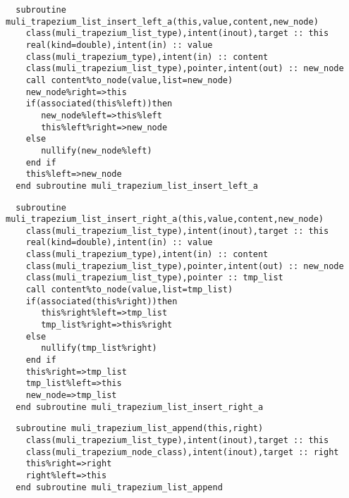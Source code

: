 \begin{Verbatim}
  subroutine muli_trapezium_list_insert_left_a(this,value,content,new_node)
    class(muli_trapezium_list_type),intent(inout),target :: this
    real(kind=double),intent(in) :: value
    class(muli_trapezium_type),intent(in) :: content
    class(muli_trapezium_list_type),pointer,intent(out) :: new_node
    call content%to_node(value,list=new_node)
    new_node%right=>this
    if(associated(this%left))then
       new_node%left=>this%left
       this%left%right=>new_node
    else
       nullify(new_node%left)
    end if
    this%left=>new_node
  end subroutine muli_trapezium_list_insert_left_a
\end{Verbatim}

\begin{Verbatim}
  subroutine muli_trapezium_list_insert_right_a(this,value,content,new_node)
    class(muli_trapezium_list_type),intent(inout),target :: this
    real(kind=double),intent(in) :: value
    class(muli_trapezium_type),intent(in) :: content
    class(muli_trapezium_list_type),pointer,intent(out) :: new_node
    class(muli_trapezium_list_type),pointer :: tmp_list
    call content%to_node(value,list=tmp_list)
    if(associated(this%right))then
       this%right%left=>tmp_list
       tmp_list%right=>this%right
    else
       nullify(tmp_list%right)
    end if
    this%right=>tmp_list
    tmp_list%left=>this
    new_node=>tmp_list
  end subroutine muli_trapezium_list_insert_right_a
\end{Verbatim}

\begin{Verbatim}
  subroutine muli_trapezium_list_append(this,right)
    class(muli_trapezium_list_type),intent(inout),target :: this
    class(muli_trapezium_node_class),intent(inout),target :: right
    this%right=>right
    right%left=>this
  end subroutine muli_trapezium_list_append
\end{Verbatim}


